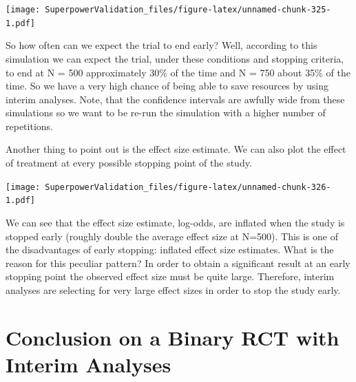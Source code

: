 \documentclass[
]{book}
\newenvironment{Shaded}{\begin{snugshade}}{\end{snugshade}}
\newcommand{\AttributeTok}[1]{\textcolor[rgb]{0.77,0.63,0.00}{#1}}
\newcommand{\DecValTok}[1]{\textcolor[rgb]{0.00,0.00,0.81}{#1}}
\newcommand{\FunctionTok}[1]{\textcolor[rgb]{0.00,0.00,0.00}{#1}}
\newcommand{\NormalTok}[1]{#1}
\newcommand{\SpecialCharTok}[1]{\textcolor[rgb]{0.00,0.00,0.00}{#1}}
\newcommand{\StringTok}[1]{\textcolor[rgb]{0.31,0.60,0.02}{#1}}
\begin{document}
\texttt{[image: SuperpowerValidation\_files/figure-latex/unnamed-chunk-325-1.pdf]}

So how often can we expect the trial to end early? Well, according to this simulation we can expect the trial, under these conditions and stopping criteria, to end at N = 500 approximately 30\% of the time and N = 750 about 35\% of the time. So we have a very high chance of being able to save resources by using interim analyses. Note, that the confidence intervals are awfully wide from these simulations so we want to be re-run the simulation with a higher number of repetitions.

Another thing to point out is the effect size estimate. We can also plot the effect of treatment at every possible stopping point of the study.

\begin{Shaded}
\end{Shaded}

\texttt{[image: SuperpowerValidation\_files/figure-latex/unnamed-chunk-326-1.pdf]}

We can see that the effect size estimate, log-odds, are inflated when the study is stopped early (roughly double the average effect size at N=500). This is one of the disadvantages of early stopping: inflated effect size estimates. What is the reason for this peculiar pattern? In order to obtain a significant result at an early stopping point the observed effect size must be quite large. Therefore, interim analyses are selecting for very large effect sizes in order to stop the study early.

\hypertarget{conclusion-on-a-binary-rct-with-interim-analyses}{%
\section{Conclusion on a Binary RCT with Interim Analyses}\label{conclusion-on-a-binary-rct-with-interim-analyses}}
\end{document}
